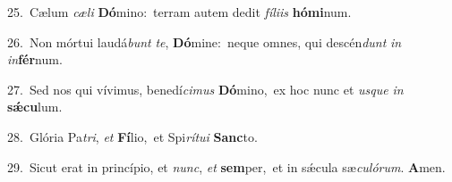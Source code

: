 {\numbfont\textcolor{\numbcolor}{25.}}~Cælum \textit{cæ}\-\textit{li} \textbf{Dó}\-mino:~\star terram autem dedit \textit{fí}\-\textit{li}\textit{is} \textbf{hó}\-\textbf{mi}num.\par
{\numbfont\textcolor{\numbcolor}{26.}}~Non mórtui laudá\textit{bunt} \textit{te}\-, \textbf{Dó}\-mine:~\star neque omnes, qui descén\textit{dunt} \textit{in} \textit{in}\-\textbf{fér}num.\par
{\numbfont\textcolor{\numbcolor}{27.}}~Sed nos qui vívimus, benedí\-\textit{ci}\-\textit{mus} \textbf{Dó}\-mino,~\star ex hoc nunc et \textit{us}\-\textit{que} \textit{in} \textbf{sǽ}\-\textbf{cu}lum.\par
{\numbfont\textcolor{\numbcolor}{28.}}~Glória Pa\-\textit{tri}\-, \textit{et} \textbf{Fí}\-lio,~\star et Spi\-\textit{rí}\-\textit{tu}\textit{i} \textbf{Sanc}\-to.\par
{\numbfont\textcolor{\numbcolor}{29.}}~Sicut erat in princípio, et \textit{nunc}\-, \textit{et} \textbf{sem}\-per,~\star et in sǽcula sæ\-\textit{cu}\-\textit{ló}\textit{rum}. \textbf{A}\-men.\par
